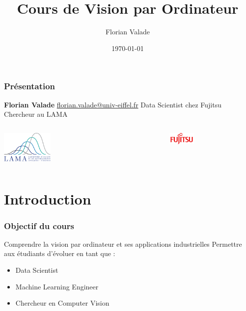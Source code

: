 \documentclass{beamer}
\title{Cours de Vision par Ordinateur}
\author{Florian Valade}
\date{\today}
\begin{document}
\begin{frame}
    \titlepage
\end{frame}

\begin{frame}
    \frametitle{Présentation}
    \textbf{Florian Valade} \newline
    \href{mailto:florian.valade@univ-eiffel.fr}{florian.valade@univ-eiffel.fr} \newline
    Data Scientist chez Fujitsu \newline
    Chercheur au LAMA \newline
    \begin{columns}
        \begin{column}{0.5\textwidth}
            \begin{flushleft}
                \includegraphics[width=0.3\textwidth]{images/lama.png}
            \end{flushleft}
        \end{column}
        \begin{column}{0.5\textwidth}
            \begin{flushright}
                \includegraphics[width=0.3\textwidth]{images/fujitsu.png}
            \end{flushright}
        \end{column}
    \end{columns}
\end{frame}

\section{Introduction}

\begin{frame}
    \frametitle{Objectif du cours}
    Comprendre la vision par ordinateur et ses applications industrielles \newline
    Permettre aux étudiants d'évoluer en tant que :
    \begin{itemize}
        \item Data Scientist
        \item Machine Learning Engineer
        \item Chercheur en Computer Vision
    \end{itemize}
\end{frame}
\end{document}
